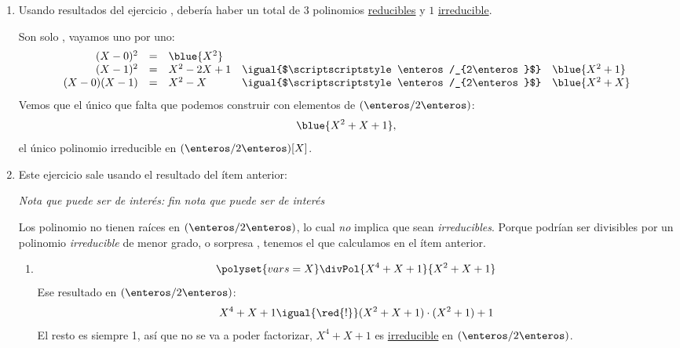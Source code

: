 \begin{enumerate}[label=\roman*)]
  \item
        Usando resultados del ejercicio ,
        debería haber un total de $3$ polinomios \ul{reducibles} y $1$ \ul{irreducible}.

        Son solo , vayamos uno por uno:
        $$
          \begin{array}{rclcl}
            (X - 0)^2      & = & \blue{X^2}                                                                         \\
            (X - 1)^2      & = & X^2 - 2X + 1 & \igual{$\scriptscriptstyle \enteros/_{2\enteros}$} & \blue{X^2 + 1} \\
            (X - 0)(X - 1) & = & X^2 - X      & \igual{$\scriptscriptstyle \enteros/_{2\enteros}$} & \blue{X^2 + X}
          \end{array}
        $$
        Vemos que el único que falta que podemos construir con elementos de $(\enteros/2\enteros)$:
        $$
          \blue{X^2 + X + 1},
        $$
        el único polinomio irreducible en $(\enteros/2\enteros)[X]$.

  \item
        Este ejercicio sale usando el resultado del ítem anterior:

        \textit{Nota que puede ser de interés:}
        \textit{fin nota que puede ser de interés}

        Los polinomio no tienen raíces en $(\enteros/2\enteros)$, lo cual \textit{no} implica que sean \textit{irreducibles}. Porque
        podrían ser divisibles por un polinomio \textit{irreducible} de menor grado, o sorpresa \red{\surprise}, tenemos el que calculamos
        en el ítem anterior.

        \begin{enumerate}[label=(\alph*)]
          \item
                $$
                  \polyset{vars=X}
                  \divPol{X^4 + X + 1}{X^2 + X + 1}
                $$
                Ese resultado en $(\enteros/2\enteros)$:
                $$
                  X^4 + X + 1 \igual{\red{!}} (X^2 + X + 1)\cdot(X^2 + 1) + 1
                $$
                El resto es siempre 1, así que no se va a poder factorizar, $X^4 + X + 1$ es \ul{irreducible} en $(\enteros/2\enteros)$.


\end{enumerate}
\end{enumerate}
